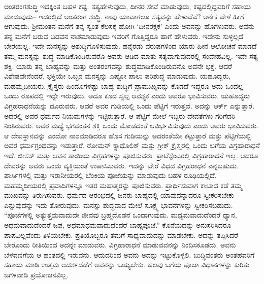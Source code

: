 ಅಂತರಂಗಶುದ್ಧಿ ಇದಕ್ಕಿಂತ ಬಹಳ ಕಷ್ಟ. ಸತ್ಯಹೇಳುವುದು, ದೀನರ ಸೇವೆ ಮಾಡುವುದು, ಕಷ್ಟದಲ್ಲಿದ್ದವರಿಗೆ ಸಹಾಯ ಮಾಡುವುದು– ಇದರಲ್ಲಿದೆ ಅಂತರಂಗ ಶುದ್ಧಿ. ನಾವು ಯಾವಾಗಲೂ ಸತ್ಯವನ್ನು ಹೇಳುವೆವೆ? ಅನೇಕ ವೇಳೆ ಹೀಗೆ ಆಗುವುದು. ಶ‍್ರೀಮಂತನ ಮನೆಗೆ ತನ್ನ ಸ್ವಂತ ಕೆಲಸಕ್ಕೆ ಹೋಗಿ ‘ದೀನರಕ್ಷಕ’ ಎಂದು ಅವನನ್ನು ಹೊಗಳುವರು. ಅವನು ತನ್ನ ಮನೆಗೆ ಬರುವ ಬಡವನ ನಾಶಮಾಡುವುದು ಇವರಿಗೆ ಗೊತ್ತಿದ್ದರೂ ಹಾಗೆ ಹೇಳುವರು. ಇದೇನು ಸುಳ್ಳಲ್ಲದೆ ಬೇರೆಯಲ್ಲ. ಇದೇ ಮನಸ್ಸನ್ನು ಅಶುದ್ಧಿಗೊಳಿಸುವುದು. ಹನ್ನೆರಡು ವರುಷಗಳಿಂದ ಯಾರು ಹೀನ ಆಲೋಚನೆ ಮಾಡದೆ ತಮ್ಮ ಮನಸ್ಸನ್ನು ಶುದ್ಧ ಮಾಡಿಕೊಂಡಿರುವರೊ ಅವರು ಆಡಿದ ಮಾತು ಸತ್ಯವಾಗುವುದರಲ್ಲಿ ಸಂದೇಹವಿಲ್ಲ. ಇದೇ ಸತ್ಯ ಶಕ್ತಿ. ಯಾರು ತನ್ನ ಬಾಹ್ಯವನ್ನು ಮತ್ತು ಅಂತರಂಗವನ್ನು ಶುದ್ಧಮಾಡಿಕೊಂಡಿರುವನೊ ಅವನೇ ಭಕ್ತ. ಆದರೆ ವಿಶೇಷವೇನೆಂದರೆ, ಭಕ್ತಿಯೇ ಒಬ್ಬನ ಮನಸ್ಸನ್ನು ಎಷ್ಟೋ ಪಾಲು ಪರಿಶುದ್ಧ ಮಾಡುವುದು. ಯಹೂದ್ಯರು, ಮಹಮ್ಮದೀಯರು, ಕ್ರೈಸ್ತರು ಹಿಂದೂಗಳಷ್ಟು ಬಾಹ್ಯ ಶುದ್ಧಿಗೆ ಪ್ರಾಮುಖ್ಯವನ್ನು ಕೊಡದೆ ಇದ್ದರೂ ಅದು ಒಂದಲ್ಲ ಒಂದು ರೂಪದಲ್ಲಿ ಇದ್ದೇ ಇರುವುದು. ಅದೂ ಕೂಡ ಸ್ವಲ್ಪ ಆವಶ್ಯಕ ಎಂದು ಅವರೂ ಭಾವಿಸುವರು. ಯಹೂದ್ಯರು ವಿಗ್ರಹರಾಧನೆಯನ್ನು ದೂರುವರು. ಆದರೆ ಅವರ ಗುಡಿಯಲ್ಲಿ ಒಂದು ಪೆಟ್ಟಿಗೆ ಇರುತ್ತದೆ. ಅದನ್ನು ಆರ್ಕ್​ ಎನ್ನುತ್ತಾರೆ. ಅದರಲ್ಲಿ ಅವರ ಧರ್ಮದ ನಿಯಮಗಳನ್ನು ಇಟ್ಟಿರುತ್ತಾರೆ. ಆ ಪೆಟ್ಟಿಗೆ ಮೇಲೆ ಇಬ್ಬರು ದೇವತೆಗಳು ಗರಿಗೆದರಿ ನಿಂತಿರುವರು. ಅವರ ಮಧ್ಯೆ ಭಗವಂತನ ಶಕ್ತಿ ಒಂದು ಮೋಡದಂತೆ ಆವಿರ್ಭವಿಸುವುದು ಎಂದು ಅವರು ಭಾವಿಸುವರು. ಆ ದೇವಸ್ಥಾನವನ್ನು ಎಂದೋ ನಾಶಮಾಡಿದರೂ ಹೊಸ ಗುಡಿಯನ್ನು ಅದರಂತೆಯೇ ಕಟ್ಟುತ್ತಾರೆ ಮತ್ತು ಪೆಟ್ಟಿಗೆಯಲ್ಲಿ ಅವರ ಧರ್ಮಗ್ರಂಥವನ್ನು ಇಡುತ್ತಾರೆ. ರೋಮನ್​ ಕ್ಯಾಥೊಲಿಕ್​ ಮತ್ತು ಗ್ರೀಕ್​ ಕ್ರೈಸ್ತರಲ್ಲಿ ಒಂದು ಬಗೆಯ ವಿಗ್ರಹಾರಾಧನೆ ಇದೆ. ಜೀಸಸ್​ ಮತ್ತು ಆವನ ತಾಯಿಯ ವಿಗ್ರಹಗಳನ್ನು ಪೂಜಿಸುವರು. ಪ್ರಾಟೆಸ್ಟೆಂಟರಲ್ಲಿ ವಿಗ್ರಹಾರಾಧನೆ ಇಲ್ಲ. ಆದರೂ ದೇವರನ್ನು ಅವರು ಒಂದು ವ್ಯಕ್ತಿಯಂತೆ ಉಪಾಸಿಸುವರು. ಇದನ್ನು ಬೇರೆ ವಿಧದ ವಿಗ್ರಹರಾಧನೆ ಎನ್ನಬಹುದು. ಪಾರ್ಸಿಗಳಲ್ಲಿ ಮತ್ತು ಇರಾನೀಯರಲ್ಲಿ ಬೆಂಕಿಯ ಪೂಜೆಯನ್ನು ಮಾಡುವುದು ಬಹಳ ರೂಢಿಯಲ್ಲಿದೆ. ಮಹಮ್ಮದೀಯರಲ್ಲಿ ಪ್ರವಾದಿಗಳನ್ನೂ ಇತರ ಮಹಾತ್ಮರನ್ನು ಪೂಜಿಸುವರು. ಪ್ರಾರ್ಥಿಸುವಾಗ ಕಾಬಾದ ಕಡೆ ತಮ್ಮ ಮುಖವನ್ನು ತಿರುಗಿಸುವರು. ಧರ್ಮದ ಆರಂಭದಲ್ಲಿ ಜನರು ಬಾಹ್ಯದಲ್ಲಿ ಯಾವುದನ್ನಾದರೂ ಸ್ವೀಕರಿಸಬೇಕು ಎನ್ನುವುದನ್ನು ಇದು ತೋರುವುದು. ಮನಸ್ಸು ಶುದ್ಧವಾದ ಮೇಲೆ ಸೂಕ್ಷ್ಮ ಭಾವನೆಗಳನ್ನು ಸ್ವೀಕರಿಸಬಹುದು. “ಪೂಜೆಗಳಲ್ಲಿ ಅತ್ಯುತ್ತಮವಾದುದೇ ಜೀವವು ಬ್ರಹ್ಮದೊಡನೆ ಒಂದಾಗುವುದು. ಮಧ್ಯಮವಾದುದೆಂದರೆ ಧ್ಯಾನ, ಅಧಮವಾದುದೆಂದರೆ ಜಪ, ಅಧಮಾಧಮವಾದುದೆಂದರೆ ಬಾಹ್ಯಪೂಜೆ.” ಕೊನೆಯದನ್ನು ಅನುಸರಿಸಿದರೂ ಪಾಪವಿಲ್ಲವೆಂದು ತಿಳಿಯಬೇಕು. ಪ್ರತಿಯೊಬ್ಬರೂ ತಮಗೆ ಸಾಧ್ಯವಾದುದನ್ನು ಮಾಡಬೇಕು. ಅದನ್ನು ತಪ್ಪಿಸಿದರೆ ಬೇರೊಂದು ರೀತಿಯಿಂದ ಅದನ್ನೇ ಮಾಡುವರು. ವಿಗ್ರಹಾರಾಧನೆ ಮಾಡುವವನನ್ನು ನಿಂದಿಸಕೂಡದು. ಅವನು ಬೆಳವಣಿಗೆಯ ಆ ಹಂತದಲ್ಲಿ ಇರುವನು. ಆದುದರಿಂದ ಅವನು ಅದನ್ನು ಇಟ್ಟುಕೊಳ್ಳಲಿ. ಬುದ್ಧಿವಂತರು ಅಂತಹವರಿಗೆ ಸಹಾಯ ಮಾಡಿ ಉತ್ತಮ ಆದರ್ಶದೆಡೆಗೆ ಅವನನ್ನು ಒಯ್ಯಬೇಕು. ಹಲವು ಬಗೆಯ ಪೂಜಾ ವಿಧಾನಗಳನ್ನು ಕುರಿತು ಜಗಳವಾಡಿ ಪ್ರಯೋಜನವಿಲ್ಲ.


